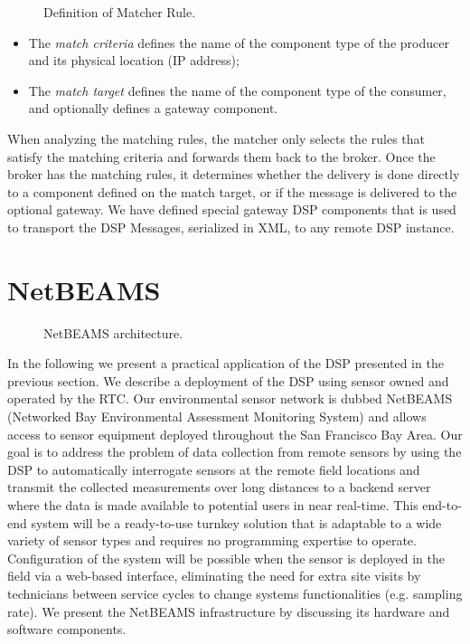\documentclass[conference]{IEEEtran}
\begin{document}
\begin{figure}[!htb]
 \caption{\label{FIG_MATCHER_RULE} Definition of Matcher Rule.}
\end{figure}

\begin{itemize}
\item The \emph{match criteria} defines the name of the component type
  of the producer and its physical location (IP address);
\item The \emph{match target} defines the name of the component type
  of the consumer, and optionally defines a gateway component.
\end{itemize}

When analyzing the matching rules, the matcher only selects the rules
that satisfy the matching criteria and forwards them back to the
broker. Once the broker has the matching rules, it determines whether
the delivery is done directly to a component defined on the match
target, or if the message is delivered to the optional gateway. We
have defined special gateway DSP components that is used to transport
the DSP Messages, serialized in XML, to any remote DSP instance.


\section{NetBEAMS}
\label{SEC_NETBEAMS}

\begin{figure*} 
\centering
{}
\caption{\label{FIG_NETBEAMS} NetBEAMS architecture.}
\end{figure*}

In the following we present a practical application of the DSP
presented in the previous section. We describe a deployment of the DSP
using sensor owned and operated by the RTC. Our environmental sensor
network is dubbed NetBEAMS (Networked Bay Environmental Assessment
Monitoring System) and allows access to sensor equipment deployed
throughout the San Francisco Bay Area.  Our goal is to address the
problem of data collection from remote sensors by using the DSP to
automatically interrogate sensors at the remote field locations and
transmit the collected measurements over long distances to a backend
server where the data is made available to potential users in near
real-time. This end-to-end system will be a ready-to-use turnkey
solution that is adaptable to a wide variety of sensor types and
requires no programming expertise to operate. Configuration of the
system will be possible when the sensor is deployed in the field via a
web-based interface, eliminating the need for extra site visits by
technicians between service cycles to change systems functionalities
(e.g. sampling rate). We present the NetBEAMS infrastructure by
discussing its hardware and software components.
\end{document}
